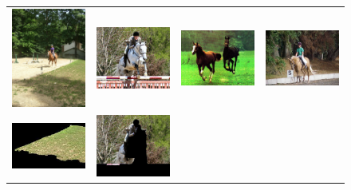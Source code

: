 \documentclass[10pt,twocolumn,letterpaper]{article}
\begin{document}
\begin{figure}[p]
\centering
\begin{tabular}{ p{4cm} p{4cm} p{4cm} p{4cm} }
\includegraphics[width=3.95cm]{figures/add_res/horse/2008_000403.jpg.eps} &
\includegraphics[width=3.95cm]{figures/add_res/horse/2008_002835.jpg.eps} &
\includegraphics[width=3.95cm]{figures/add_res/horse/2008_003055.jpg.eps} &
\includegraphics[width=3.95cm]{figures/add_res/horse/2008_004470.jpg.eps} \\
\includegraphics[width=3.95cm]{figures/add_res/horse/2008_000403.jpg_3_bad.jpg.eps} &
\includegraphics[width=3.95cm]{figures/add_res/horse/2008_002835.jpg_3_bad.jpg.eps} &

\end{tabular}
\end{figure}
\end{document}
